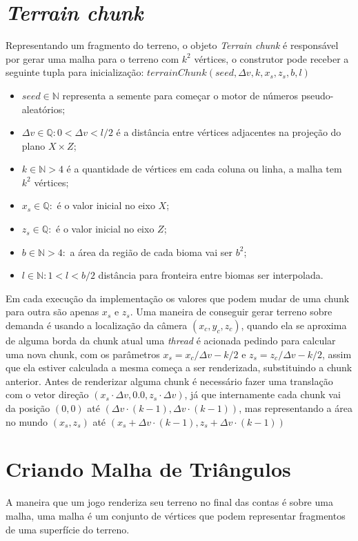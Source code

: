 \section{\textit{Terrain chunk}}
Representando um fragmento do terreno, o objeto \textit{Terrain chunk} é responsável
por gerar uma malha para o terreno com $k^2$ vértices, o construtor pode receber 
a seguinte tupla para inicialização: 
$terrainChunk(seed, \Delta{v}, k, x_{s}, z_{s}, b, l)$
\begin{itemize}
    \item $seed \in \mathbb{N}$ representa a semente para começar o motor de números
    pseudo-aleatórios;
    \item $\Delta{v} \in \mathbb{Q}:0 < \Delta{v} < l/2$ é a distância entre vértices adjacentes na
    projeção do plano $X \times Z$;
    \item $k \in \mathbb{N}>4$ é a quantidade de vértices em cada coluna ou 
    linha, a malha tem $k^2$ vértices;
    \item $x_{s} \in \mathbb{Q}:$ é o valor inicial no eixo $X$;
    \item $z_{s} \in \mathbb{Q}:$ é o valor inicial no eixo $Z$;
    \item $b \in \mathbb{N}>4:$ a área da região de cada bioma vai ser $b^2$;
    \item $l \in \mathbb{N}:1 < l < b/2$ distância para fronteira entre biomas ser interpolada.
\end{itemize}


Em cada execução da implementação os valores que podem mudar de uma chunk para 
outra são apenas $x_{s}$ e $z_{s}$. Uma maneira de conseguir gerar terreno sobre demanda
é usando a localização da câmera $(x_{c}, y_{c}, z_{c})$, quando ela se
aproxima de alguma borda da chunk atual
uma \textit{thread} é acionada pedindo para calcular uma nova chunk, com os parâmetros
$x_{s} = x_{c}/\Delta{v} - k/2$ e $z_{s} = z_{c}/\Delta{v} - k/2$, assim que ela
estiver calculada a mesma começa a ser renderizada, substituindo a chunk anterior.
Antes de renderizar alguma chunk é necessário fazer uma translação com o vetor direção 
$(x_{s} \cdot \Delta{v}, 0.0, z_{s} \cdot \Delta{v})$, já que internamente cada chunk vai 
da posição $(0, 0)$ até $(\Delta{v} \cdot (k-1), \Delta{v} \cdot (k-1))$, mas representando a área 
no mundo $(x_{s}, z_{s})$ até $(x_{s} + \Delta{v} \cdot (k-1), z_{s} + \Delta{v} \cdot (k-1))$

\section{Criando Malha de Triângulos}
A maneira que um jogo renderiza seu terreno no final das contas é sobre uma
malha, uma malha é um conjunto de vértices que podem representar fragmentos
de uma superfície do terreno.

